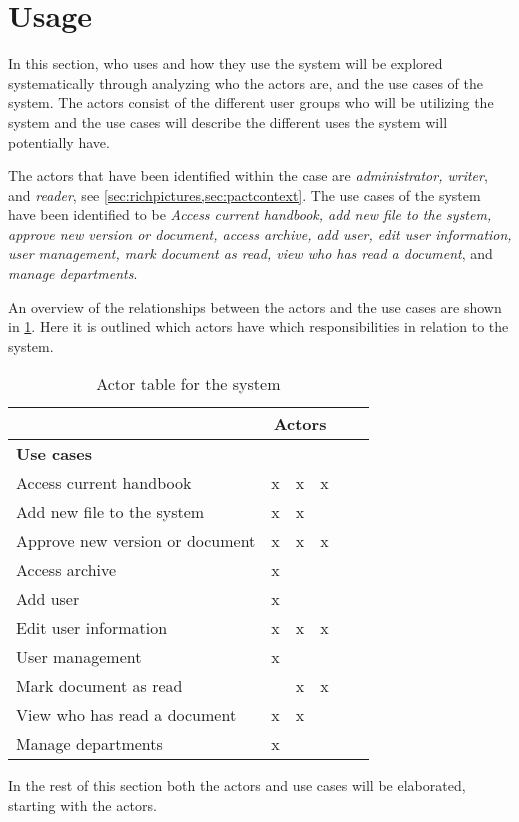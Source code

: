\section{Usage}\label{sec:Usage}
In this section, who uses and how they use the system will be explored systematically through analyzing who the actors are, and the use cases of the system.
The actors consist of the different user groups who will be utilizing the system and the use cases will describe the different uses the system will potentially have.

The actors that have been identified within the case are \textit{administrator, writer}, and \textit{reader}, see \cref{sec:richpictures,sec:pactcontext}.
The use cases of the system have been identified to be \textit{Access current handbook, add new file to the system, approve new version or document, access archive, add user, edit user information, user management, mark document as read, view who has read a document}, and \textit{manage departments}.

An overview of the relationships between the actors and the use cases are shown in \cref{tab:ActorTable}.
Here it is outlined which actors have which responsibilities in relation to the system.

\begin{table}[H]
	\begin{center}
	\begin{tabular}{| l | c | c | c | c | c |}
		\hline
		& \multicolumn{3}{c|}{\textbf{Actors}} \\
		\hline
		\textbf{Use cases} & \rotatebox{90}{Administrator }  & \rotatebox{90}{Writer} & \rotatebox{90}{Reader} \\
		\hline
		Access current handbook & x & x & x \\
		\hline
		Add new file to the system & x & x & \\
		\hline
		Approve new version or document & x & x & x \\
		\hline
		Access archive & x & & \\
		\hline
		Add user & x & & \\
		\hline
		Edit user information & x & x & x\\
		\hline
		User management & x & & \\
		\hline
		Mark document as read & & x & x \\
		\hline
		View who has read a document & x & x & \\
		\hline
		Manage departments & x & & \\
		\hline
	\end{tabular}
	\end{center}
	\caption{Actor table for the system}\label{tab:ActorTable}
\end{table}

In the rest of this section both the actors and use cases will be elaborated, starting with the actors.